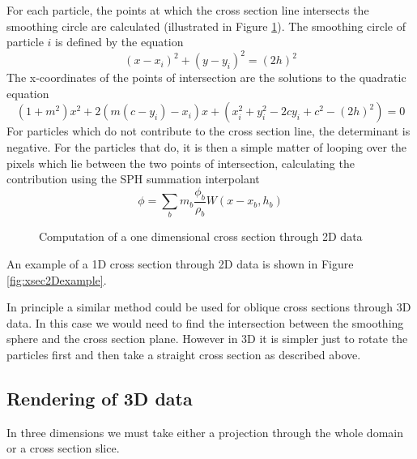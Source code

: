\documentclass[a4paper,11pt]{article}
\begin{document}
 For each particle, the points at which the cross section line intersects the
smoothing circle are calculated (illustrated in Figure \ref{fig:xsec2D}). The
smoothing circle of particle $i$ is defined by the equation
\begin{equation}
(x-x_i)^2 + (y-y_i)^2 = (2h)^2
\end{equation}
The x-coordinates of the points of intersection are the solutions to the quadratic equation
\begin{equation}
(1 + m^2) x^2 + 2 (m (c - y_i) - x_i) x + (x_i^2 + y_i^2 - 2cy_i + c^2 - (2h)^2)= 0
\end{equation}
For particles which do not contribute to the cross section line, the determinant
is negative. For the particles that do, it is then a simple matter of looping
over the pixels which lie between the two points of intersection, calculating
the contribution using the SPH summation interpolant
\begin{equation}
\phi = \sum_b m_b \frac{\phi_b}{\rho_b} W(x - x_b, h_b)
\end{equation}

\begin{figure}
\begin{center}
\caption{Computation of a one dimensional cross section through 2D data}
\label{fig:xsec2D}
\end{center}
\end{figure}
 
 An example of a 1D cross section through 2D data is shown in Figure
\ref{fig:xsec2Dexample}.
\begin{figure}
\begin{center}
\end{center}
\end{figure}

 In principle a similar method could be used for oblique cross sections
through 3D data. In this case we would need to find the intersection
between the smoothing sphere and the cross section plane. However
in 3D it is simpler just to rotate the particles first and then take
a straight cross section as described above.

\subsection{Rendering of 3D data}
 In three dimensions we must take either a projection through the whole domain or a cross section slice.
 
\end{document}
